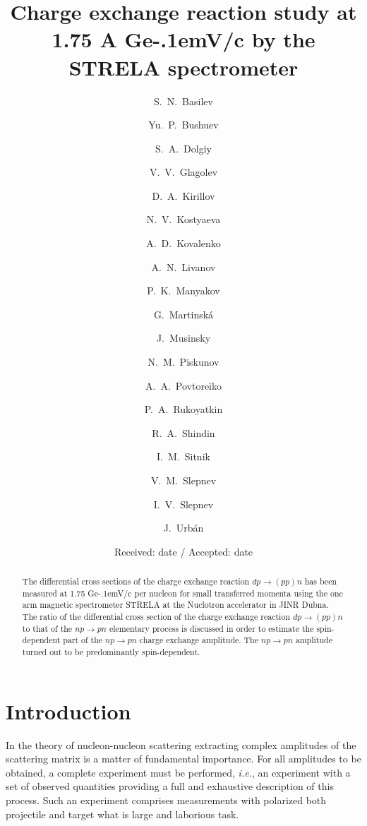 \documentclass[twocolumn,epjc3]{svjour3}
\newcommand{\np}     {\ensuremath{np \rightarrow pn}\xspace}
\newcommand{\dpchex} {\ensuremath{dp \rightarrow (pp)n}\xspace}
\newcommand{\GeVc}   {Ge\kern-.1emV/c\xspace}
\begin{document}
\title{Charge exchange \maybebm{{\dpchex}} %
  reaction study at 1.75 A \GeVc by the STRELA spectrometer}

\author{\raggedright
  S.~N.~Basilev    \and Yu.~P.~Bushuev   \and
  S.~A.~Dolgiy     \and V.~V.~Glagolev   \and
  D.~A.~Kirillov   \and N.~V.~Kostyaeva  \and
  A.~D.~Kovalenko  \and A.~N.~Livanov    \and
  P.~K.~Manyakov   \and G.~Martinsk\'{a} \and
  J.~Musinsky     \and N.~M.~Piskunov   \and
  A.~A.~Povtoreiko \and P.~A.~Rukoyatkin \and
  R.~A.~Shindin    \and I.~M.~Sitnik     \and
  V.~M.~Slepnev    \and I.~V.~Slepnev    \and
  J.~Urb\'{a}n
}



\date{Received: date / Accepted: date}
\maketitle

\begin{abstract}
  The differential cross sections of the charge exchange reaction \dpchex has
  been measured at 1.75 \GeVc per nucleon for small transferred momenta using
  the one arm magnetic spectrometer STRELA at the Nuclotron accelerator in JINR
  Dubna. The ratio of the differential cross section of the charge exchange
  reaction \dpchex to that of the \np elementary process is discussed in order
  to estimate the spin-dependent part of the \np charge exchange amplitude. The
  \np amplitude turned out to be predominantly spin-dependent.
\end{abstract}

\section{Introduction}
In the theory of nucleon-nucleon scattering extracting complex amplitudes of the
scattering matrix is a matter of fundamental importance. For all amplitudes to
be obtained, a complete experiment must be performed, \textit{i.e.}, an
experiment with a set of observed quantities providing a full and exhaustive
description of this process. Such an experiment comprises measurements with
polarized both projectile and target what is large and laborious task.
\end{document}
